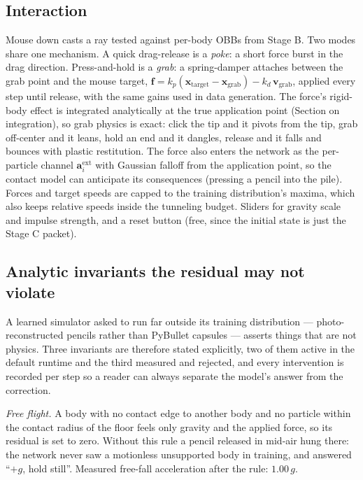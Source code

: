 \documentclass[11pt]{article}
\newcommand{\x}{\mathbf{x}}
\newcommand{\vv}{\mathbf{v}}
\begin{document}
\subsection{Interaction}
\label{sec:interaction}
Mouse down casts a ray tested against per-body OBBs from Stage B. Two modes share one mechanism. A quick drag-release is a \emph{poke}: a short force burst in the drag direction. Press-and-hold is a \emph{grab}: a spring-damper attaches between the grab point and the mouse target, $\mathbf{f} = k_p(\x_{\text{target}} - \x_{\text{grab}}) - k_d\,\vv_{\text{grab}}$, applied every step until release, with the same gains used in data generation. The force's rigid-body effect is integrated analytically at the true application point (Section on integration), so grab physics is exact: click the tip and it pivots from the tip, grab off-center and it leans, hold an end and it dangles, release and it falls and bounces with plastic restitution. The force also enters the network as the per-particle channel $\mathbf{a}_i^{\text{ext}}$ with Gaussian falloff from the application point, so the contact model can anticipate its consequences (pressing a pencil into the pile). Forces and target speeds are capped to the training distribution's maxima, which also keeps relative speeds inside the tunneling budget. Sliders for gravity scale and impulse strength, and a reset button (free, since the initial state is just the Stage C packet).

\subsection{Analytic invariants the residual may not violate}
\label{sec:invariants}
A learned simulator asked to run far outside its training distribution --- photo-reconstructed pencils rather than PyBullet capsules --- asserts things that are not physics. Three invariants are therefore stated explicitly, two of them active in the default runtime and the third measured and rejected, and every intervention is recorded per step so a reader can always separate the model's answer from the correction.

\emph{Free flight.} A body with no contact edge to another body and no particle within the contact radius of the floor feels only gravity and the applied force, so its residual is set to zero. Without this rule a pencil released in mid-air hung there: the network never saw a motionless unsupported body in training, and answered ``$+g$, hold still''. Measured free-fall acceleration after the rule: $1.00\,g$.
\end{document}
